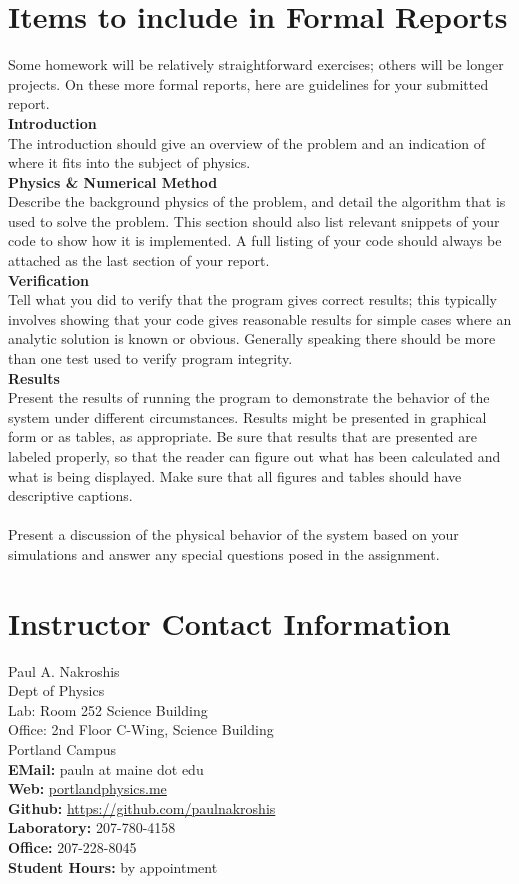 \documentclass[justified]{tufte-handout}
\begin{document}
\section{Items to include in Formal Reports}
Some homework will be relatively straightforward exercises; others will be longer projects. On these more formal reports, here are guidelines for your submitted report. \\
{\bf Introduction} \\ 
The introduction should give an overview of the problem and an indication of where it fits into the subject of physics.\\
{\bf Physics \& Numerical Method} \\ 
Describe the background physics of the problem, and detail the algorithm that is used to solve the problem. This section should also list relevant snippets of your code to show how it is implemented.  A full listing of your code should always be attached as the last section of your report.\\
{\bf Verification} \\
Tell what you did to verify that the program gives correct results; this typically involves showing that your code gives reasonable results for simple cases where an analytic solution is known or obvious.  Generally speaking there should be more than one test used to verify program integrity. \\
{\bf Results} \\
Present the results of running the program to demonstrate the behavior of the system under different circumstances. Results might be presented in graphical form or as tables, as appropriate. Be sure that results that are presented are labeled properly, so that the reader can figure out what has been calculated and what is being displayed. Make sure that all figures and tables should have descriptive captions. \\
 \\
Present a discussion of the physical behavior of the system based on your simulations and answer any special questions posed in the assignment.\\


\pagebreak
\section{Instructor Contact Information}
Paul A. Nakroshis\\
Dept of Physics\\
Lab: Room 252 Science Building\\
Office: 2nd Floor C-Wing, Science Building\\
Portland Campus\\
\hfill {\bf EMail:} {pauln at maine dot edu}\\
{\bf Web:} \href{portlandphysics.me}{portlandphysics.me}\\ 
{\bf Github:} \href{https://github.com/paulnakroshis}{https://github.com/paulnakroshis}\\
{\bf Laboratory:} 207-780-4158\\
{\bf Office:} 207-228-8045\\
{\bf Student Hours:}  by appointment\\
\end{document}
